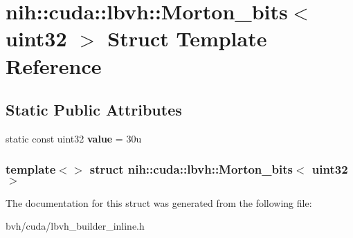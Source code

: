 \hypertarget{structnih_1_1cuda_1_1lbvh_1_1_morton__bits_3_01uint32_01_4}{
\section{nih\-:\-:cuda\-:\-:lbvh\-:\-:\-Morton\-\_\-bits$<$ uint32 $>$ \-Struct \-Template \-Reference}
\label{structnih_1_1cuda_1_1lbvh_1_1_morton__bits_3_01uint32_01_4}
}
\subsection*{\-Static \-Public \-Attributes}
\begin{DoxyCompactItemize}
\item 
\hypertarget{structnih_1_1cuda_1_1lbvh_1_1_morton__bits_3_01uint32_01_4_a21e41e687404ac655d244e3303e77170}{
static const uint32 {\bfseries value} = 30u}
\label{structnih_1_1cuda_1_1lbvh_1_1_morton__bits_3_01uint32_01_4_a21e41e687404ac655d244e3303e77170}

\end{DoxyCompactItemize}
\subsubsection*{template$<$$>$ struct nih\-::cuda\-::lbvh\-::\-Morton\-\_\-bits$<$ uint32 $>$}



\-The documentation for this struct was generated from the following file\-:\begin{DoxyCompactItemize}
\item 
bvh/cuda/lbvh\-\_\-builder\-\_\-inline.\-h\end{DoxyCompactItemize}
